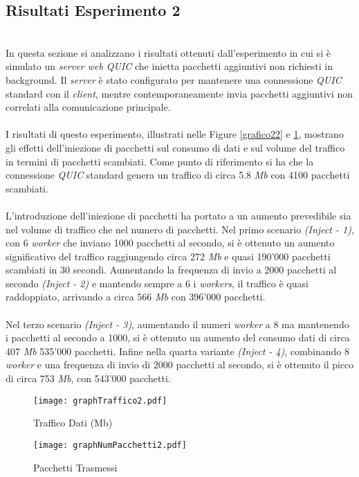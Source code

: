 \subsection{Risultati Esperimento 2}
~\\
\indent In questa sezione si analizzano i risultati ottenuti dall'esperimento in cui si è simulato un \emph{server web QUIC} che inietta pacchetti aggiuntivi non richiesti in background.
Il \emph{server} è stato configurato per mantenere una connessione \emph{QUIC} standard con il \emph{client}, mentre contemporaneamente invia pacchetti aggiuntivi non correlati alla comunicazione principale.
\\\\
I risultati di questo esperimento, illustrati nelle Figure \ref{grafico22} e \ref{grafico2}, mostrano gli effetti dell'iniezione di pacchetti sul consumo di dati e sul volume del traffico in termini di pacchetti scambiati.
Come punto di riferimento si ha che la connessione \emph{QUIC} standard genera un traffico di circa 5.8 \emph{Mb} con 4100 pacchetti scambiati.
\\\\
L'introduzione dell'iniezione di pacchetti ha portato a un aumento prevedibile sia nel volume di traffico che nel numero di pacchetti.
Nel primo scenario \emph{(Inject - 1)}, con 6 \emph{worker} che inviano 1000 pacchetti al secondo, si è ottenuto un aumento significativo del traffico raggiungendo circa 272 \emph{Mb} e quasi 190'000 pacchetti scambiati in 30 secondi. 
Aumentando la frequenza di invio a 2000 pacchetti al secondo \emph{(Inject - 2)} e mantendo sempre a 6 i \emph{workers}, il traffico è quasi raddoppiato, arrivando a circa 566 \emph{Mb} con 396'000 pacchetti.
\\\\
Nel terzo scenario \emph{(Inject - 3)}, aumentando il numeri \emph{worker} a 8 ma mantenendo i pacchetti al secondo a 1000, si è ottenuto un aumento del consumo dati di circa 407 \emph{Mb} 535'000 pacchetti. 
Infine nella quarta variante \emph{(Inject - 4)}, combinando 8 \emph{worker} e una frequenza di invio di 2000 pacchetti al secondo, si è ottenuto il picco di circa 753 \emph{Mb}, con 543'000 pacchetti.
\begin{figure}[!h]
    \centering
    \begin{minipage}{0.48\textwidth}
        \centering
        \texttt{[image: graphTraffico2.pdf]}
        \caption{Traffico Dati (Mb)}
        \label{grafico22}
    \end{minipage}
    \hfill
    \begin{minipage}{0.48\textwidth}
        \centering
        \texttt{[image: graphNumPacchetti2.pdf]}
        \caption{Pacchetti Trasmessi}
        \label{grafico2}
    \end{minipage}
\end{figure}
